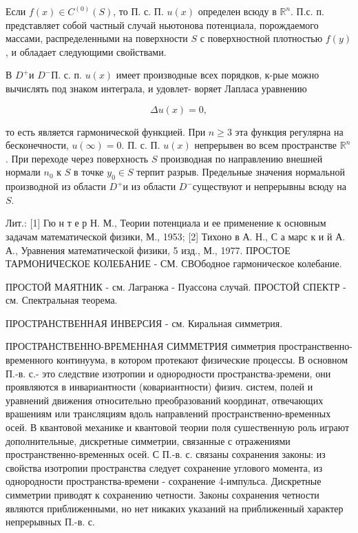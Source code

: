 \documentclass[10pt]{article}
\begin{document}
Если $f(x) \in C^{(0)}(S)$, то П. с. П. $u(x)$ определен всюду в $\mathbb{R}^{n}$. П.с. п. представляет собой частный случай ньютонова потенциала, порождаемого массами, распределенными на поверхности $S$ с поверхностной плотностью $f(y)$, и обладает следующими свойствами.



В $D^{+}$и $D^{-}$П. с. п. $u(x)$ имеет производные всех порядков, к-рые можно вычислять под знаком интеграла, и удовлет- воряет Лапласа уравнению



\[

\Delta u(x)=0,

\]



то есть является гармонической функцией. При $n \geqslant 3$ эта функция регулярна на бесконечности, $u(\infty)=0$. П. с. П. $u(x)$ непрерывен во всем пространстве $\mathbb{R}^{n}$. При переходе через поверхность $S$ производная по направлению внешней нормали $n_{0}$ к $S$ в точке $y_{0} \in S$ терпит разрыв. Предельные значения нормальной производной из области $D^{+}$и из области $D^{-}$существуют и непрерывны всюду на $S$.



Лит.: [1] Гю н т е р Н. М., Теории потенциала и ее применение к основным задачам математической физики, М., 1953; [2] Тихоно в А. Н., С а марс к и й А. А., Уравнения математической физики, 5 изд., М., 1977. ПРОСТОЕ ТАРМОНИЧЕСКОЕ КОЛЕБАНИЕ - СМ. СВОбодное гармоническое колебание.



ПРОСТОЙ МАЯТНИК - см. Лагранжа - Пуассона случай. ПРОСТОЙ СПЕКТР - см. Спектральная теорема.



ПРОСТРАНСТВЕННАЯ ИНВЕРСИЯ - см. Киральная симметрия.



ПРОСТРАНСТВЕННО-ВРЕМЕННАЯ СИММЕТРИЯ симметрия пространственно-временного континуума, в котором протекают физические процессы. В основном П.-в. с.- это следствие изотропии и однородности пространства-зремени, они проявляются в инвариантности (ковариантности) физич. систем, полей и уравнений движения относительно преобразований координат, отвечающих врашениям или трансляциям вдоль направлений пространственно-временных осей. В квантовой механике и квантовой теории поля сушественную роль играют дополнительные, дискретные симметрии, связанные с отражениями пространственно-временных осей. С П.-в. с. связаны сохранения законы: из свойства изотропии пространства следует сохранение углового момента, из однородности пространства-времени - сохранение 4-импульса. Дискретные симметрии приводят к сохранению четности. Законы сохранения четности являются приближенными, но нет никаких указаний на приближенный характер непрерывных П.-в. с.
\end{document}
